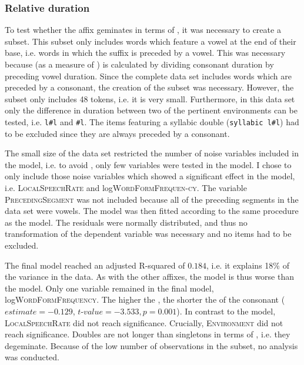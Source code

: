 \subsubsection{Relative duration}

To test whether the affix  geminates in terms of , it was necessary to create a subset. This subset only includes words which feature a vowel at the end of their base, i.e. words in which the suffix is preceded by a vowel. This was necessary because  (as a measure of ) is calculated by dividing consonant duration by preceding vowel duration. Since the complete data set includes words which are preceded by a consonant, the creation of the subset was necessary.
However, the subset only includes 48 tokens, i.e. it is very small. Furthermore, in this data set only the difference in duration between two of the pertinent environments can be tested, i.e. \texttt{l\#l} and \texttt{\#l}. The items featuring a syllabic double (\texttt{syllabic l\#l}) had to be excluded since they are always preceded by a consonant. 

The small size of the data set restricted the number of noise variables included in the model, i.e. to avoid , only few variables were tested in the model. I chose to only include those noise variables which showed a significant effect in the  model, i.e. \textsc{LocalSpeechRate} and log\textsc{WordFormFrequen-cy}. The variable \textsc{PrecedingSegment} was not included because all of the preceding segments in the data set were vowels. The model was then fitted according to the same procedure as the  model. The residuals were normally distributed, and thus no transformation of the dependent variable was necessary and no items had to be excluded.

The final model reached an adjusted R-squared of $0.184$, i.e. it explains 18\% of the variance in the data. As with the other affixes, the  model is thus worse than the  model. Only one variable remained in the final model, log\textsc{WordFormFrequency}. The higher the , the shorter the  of the consonant ($estimate= -0.129$, $t$-$value=-3.533, p=0.001$). In contrast to the  model, \textsc{LocalSpeechRate} did not reach significance. Crucially, \textsc{Environment} did not reach significance. Doubles are not longer than singletons in terms of , i.e. they degeminate.
Because of the low number of observations in the subset, no  analysis was conducted.

